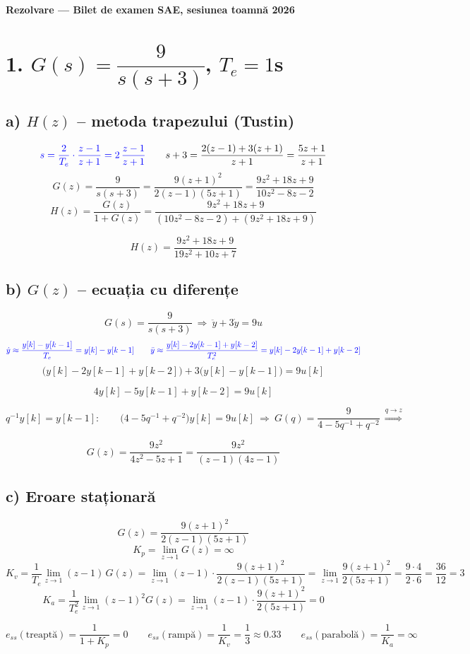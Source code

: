 \documentclass[10pt,a4paper]{article}
\begin{document}
\begin{center}
{\large\bfseries Rezolvare --- Bilet de examen SAE, sesiunea toamn\u{a} 2026}
\end{center}
\vspace{-0.2cm}

\section*{1. $G(s)=\dfrac{9}{s(s+3)}$, $T_e=1$s}

\subsection*{a) $H(z)$ -- metoda trapezului (Tustin)}
$$\textcolor{blue}{s=\frac2{T_e}\cdot\frac{z-1}{z+1}=2\,\frac{z-1}{z+1}}\qquad s+3=\frac{2(z-1)+3(z+1)}{z+1}=\frac{5z+1}{z+1}$$
$$G(z)=\frac9{s(s+3)}=\frac{9(z+1)^2}{2(z-1)(5z+1)}=\frac{9z^2+18z+9}{10z^2-8z-2}$$
$$H(z)=\frac{G(z)}{1+G(z)}=\frac{9z^2+18z+9}{(10z^2-8z-2)+(9z^2+18z+9)}$$
\begin{res}
$$H(z)=\frac{9z^2+18z+9}{19z^2+10z+7}$$
\end{res}

\subsection*{b) $G(z)$ -- ecuația cu diferențe}
$$G(s)=\frac9{s(s+3)}\ \Rightarrow\ \ddot y+3\dot y=9u$$
$$\color{blue}\dot y\approx\frac{y[k]-y[k-1]}{T_e}=y[k]-y[k-1]\qquad
\ddot y\approx\frac{y[k]-2y[k-1]+y[k-2]}{T_e^2}=y[k]-2y[k-1]+y[k-2]$$
$$\big(y[k]-2y[k-1]+y[k-2]\big)+3\big(y[k]-y[k-1]\big)=9u[k]$$
\begin{res}
$$4y[k]-5y[k-1]+y[k-2]=9u[k]$$
\end{res}
$$q^{-1}y[k]=y[k-1]:\qquad \big(4-5q^{-1}+q^{-2}\big)y[k]=9u[k]\ \Rightarrow\ G(q)=\frac9{4-5q^{-1}+q^{-2}}\ \overset{q\to z}{\Rightarrow}$$
\begin{res}
$$G(z)=\frac{9z^2}{4z^2-5z+1}=\frac{9z^2}{(z-1)(4z-1)}$$
\end{res}

\subsection*{c) Eroare staționară}
$$G(z)=\frac{9(z+1)^2}{2(z-1)(5z+1)}$$
$$K_p=\lim_{z\to1}G(z)=\infty$$
$$K_v=\frac1{T_e}\lim_{z\to1}(z-1)\,G(z)=\lim_{z\to1}(z-1)\cdot\frac{9(z+1)^2}{2(z-1)(5z+1)}=\lim_{z\to1}\frac{9(z+1)^2}{2(5z+1)}=\frac{9\cdot4}{2\cdot6}=\frac{36}{12}=3$$
$$K_a=\frac1{T_e^2}\lim_{z\to1}(z-1)^2G(z)=\lim_{z\to1}(z-1)\cdot\frac{9(z+1)^2}{2(5z+1)}=0$$
\begin{res}
$$e_{ss}(\text{treaptă})=\frac1{1+K_p}=0\qquad
e_{ss}(\text{rampă})=\frac1{K_v}=\frac13\approx0.33\qquad
e_{ss}(\text{parabolă})=\frac1{K_a}=\infty$$
\end{res}
\end{document}
